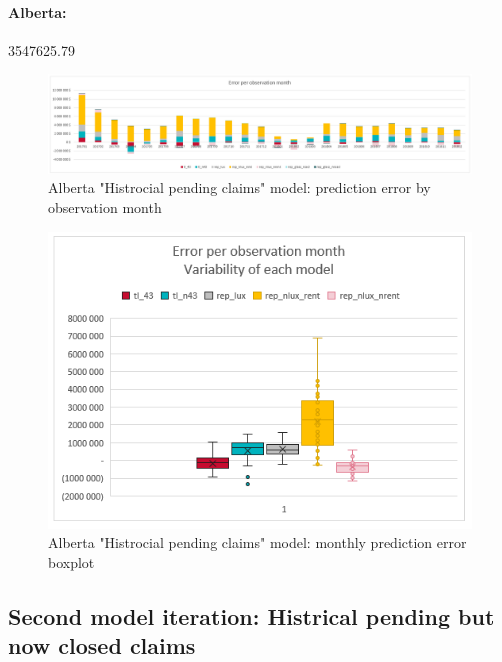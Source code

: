 	\paragraph{Alberta:}
		3547625.79
		\begin{figure}[H]
			\begin{center}
				\includegraphics[scale=0.2]{Graphiques/AB_current_model_by_month} 
				\renewcommand{\figurename}{Figure}
				\caption{Alberta "Histrocial pending claims" model: prediction error by observation month}\label{Fig_AB_current_er_by_month}
			\end{center}
		\end{figure}
		\begin{figure}[H]
			\begin{center}
				\includegraphics[scale=0.2]{Graphiques/AB_current_model_mustach} 
				\renewcommand{\figurename}{Figure}
				\caption{Alberta "Histrocial pending claims" model: monthly prediction error boxplot}\label{Fig_AB_current_er_boxplot}
			\end{center}
		\end{figure}
	
\subsection{Second model iteration: Histrical pending but now closed claims}
